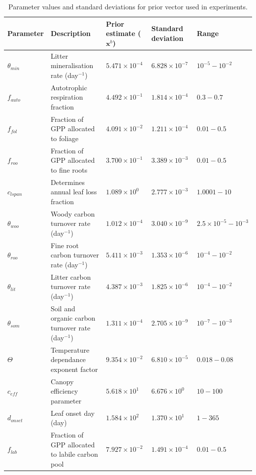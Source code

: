 \begin{table}[ht] 
	\caption{Parameter values and standard deviations for prior vector used in experiments.}
\begin{center}
\scriptsize
	\begin{tabular}{| l | p{4.5cm} | p{1.7cm} | p{1.7cm} | p{1.7cm} |}
	\hline
	Parameter & Description & Prior estimate ($\textbf{x}^{b}$) & Standard deviation & Range \\ \hline
$\theta_{min}$ & Litter mineralisation rate (day$^{-1}$) & $5.471\times 10^{-4}$ & $6.828\times 10^{-7}$ & $10^{-5} - 10^{-2}$ \\ \hline
$f_{auto}$ & Autotrophic respiration fraction & $4.492\times 10^{-1}$ & $1.814\times 10^{-4}$ & $0.3 - 0.7$  \\ \hline
$f_{fol}$ & Fraction of GPP allocated to foliage & $4.091\times 10^{-2}$ & $1.211\times 10^{-4}$ & $0.01-0.5$ \\ \hline
$f_{roo}$ & Fraction of GPP allocated to fine roots & $3.700\times 10^{-1}$ & $3.389\times 10^{-3}$ & $0.01-0.5$ \\ \hline
$c_{lspan}$ & Determines annual leaf loss fraction & $1.089\times 10^{0} $ & $2.777\times 10^{-3}$ & $1.0001 - 10$ \\ \hline
$\theta_{woo}$ & Woody carbon turnover rate (day$^{-1}$) & $1.012\times 10^{-4}$ & $3.040\times 10^{-9}$ & $2.5\times10^{-5} - 10^{-3}$ \\ \hline
$\theta_{roo}$ & Fine root carbon turnover rate (day$^{-1}$) & $5.411\times 10^{-3}$ & $1.353\times 10^{-6}$ & $10^{-4} - 10^{-2}$ \\ \hline
$\theta_{lit}$ & Litter carbon turnover rate (day$^{-1}$) & $4.387\times 10^{-3}$ & $1.825\times 10^{-6}$ & $10^{-4} - 10^{-2}$ \\ \hline
$\theta_{som}$ & Soil and organic carbon turnover rate (day$^{-1}$) & $1.311\times 10^{-4}$ & $2.705\times 10^{-9}$ & $10^{-7} - 10^{-3}$ \\ \hline
$\Theta$ & Temperature dependance exponent factor & $9.354\times 10^{-2}$ & $6.810\times 10^{-5}$ & $0.018 - 0.08$ \\ \hline
$c_{eff}$ & Canopy efficiency parameter & $5.618\times 10^{1}$ & $6.676\times 10^{0}$ & $10 - 100$ \\ \hline
$d_{onset}$ & Leaf onset day (day) & $1.584\times 10^{2}$ & $1.370\times 10^{1}$ & $1 - 365$ \\ \hline
$f_{lab}$ & Fraction of GPP allocated to labile carbon pool & $7.927\times 10^{-2}$ & $1.491\times 10^{-4}$ & $0.01 - 0.5$ \\ \hline

\end{tabular}
\end{center}
\end{table}
